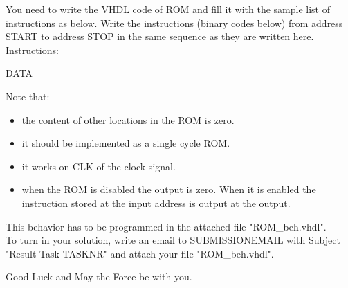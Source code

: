 \documentclass[a4paper,12pt]{article}
\begin{document}
You need to write the VHDL code of ROM and fill it with the sample list of instructions as below. Write the instructions (binary codes below) from address {{START}} to address {{STOP}} in the same sequence as they are written here. \\
Instructions:
\begin{center}
{{DATA}}\newline
\end{center}

Note that:

\begin{itemize}
\item the content of other locations in the ROM is zero.
\item it should be implemented as a single cycle ROM.
\item it works on {{CLK}} of the clock signal.
\item when the ROM is disabled the output is zero. When it is enabled the instruction stored at the input address is output at the output.
\end{itemize}

This behavior has to be programmed in the attached file "ROM\_beh.vhdl".\\

To turn in your solution, write an email to {{SUBMISSIONEMAIL}} with Subject "Result Task {{TASKNR}}" and attach your file "ROM\_beh.vhdl".

\vspace{0.7cm}

Good Luck and May the Force be with you.
\end{document}
